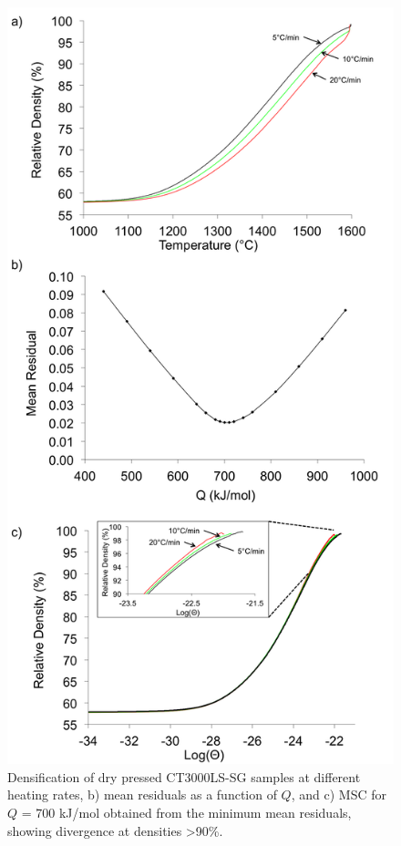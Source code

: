 \newpage
\begin{figure}[H]
	\centering
	\includegraphics[scale=0.4]{Chapter-6/Figures/Figure7.png}
	\caption{Densification of dry pressed CT3000LS-SG samples at different heating rates, b) mean residuals as a function of $Q$, and c) MSC for $Q$ = 700 kJ/mol obtained from the minimum mean residuals, showing divergence at densities >90\%.}
	\label{Ch6-figure:Figure7}
\end{figure}

